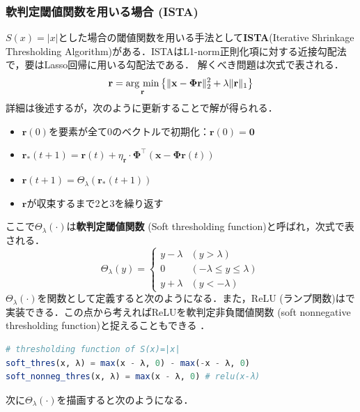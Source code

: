 \subsubsection{軟判定閾値関数を用いる場合 (ISTA)}
$S(x)=|x|$とした場合の閾値関数を用いる手法として\textbf{ISTA}(Iterative Shrinkage Thresholding Algorithm)がある．ISTAはL1-norm正則化項に対する近接勾配法で，要はLasso回帰に用いる勾配法である．
解くべき問題は次式で表される．
\begin{equation}
\mathbf{r} = \mathop{\rm arg~min}\limits_{\mathbf{r}}\left\{\|\mathbf{x}-\mathbf{\Phi}\mathbf{r}\|^2_2+\lambda\|\mathbf{r}\|_1\right\}
\end{equation}
詳細は後述するが，次のように更新することで解が得られる．
\begin{itemize}
\item $\mathbf{r}(0)$を要素が全て0のベクトルで初期化：$\mathbf{r}(0)=\mathbf{0}$
\item $\mathbf{r}_*(t+1)=\mathbf{r}(t)+\eta_\mathbf{r}\cdot \mathbf{\Phi}^\top(\mathbf{x}-\mathbf{\Phi}\mathbf{r}(t))$
\item $\mathbf{r}(t+1) = \Theta_\lambda(\mathbf{r}_*(t+1))$
\item $\mathbf{r}$が収束するまで2と3を繰り返す
\end{itemize}
ここで$\Theta_\lambda(\cdot)$は\textbf{軟判定閾値関数} (Soft thresholding function)と呼ばれ，次式で表される．
\begin{equation}
\Theta_\lambda(y)= 
\begin{cases} 
y-\lambda & (y>\lambda)\\ 
0 & (-\lambda\leq y\leq\lambda)\\ 
 y+\lambda & (y<-\lambda) 
\end{cases}
\end{equation}
$\Theta_\lambda(\cdot)$を関数として定義すると次のようになる．また，ReLU (ランプ関数)はで実装できる．この点から考えればReLUを軟判定非負閾値関数 (soft nonnegative thresholding function)と捉えることもできる \citep{Papyan2018-yr}．
\begin{lstlisting}[language=julia]
# thresholding function of S(x)=|x|
soft_thres(x, λ) = max(x - λ, 0) - max(-x - λ, 0)
soft_nonneg_thres(x, λ) = max(x - λ, 0) # relu(x-λ)
\end{lstlisting}
次に$\Theta_\lambda(\cdot)$を描画すると次のようになる．
